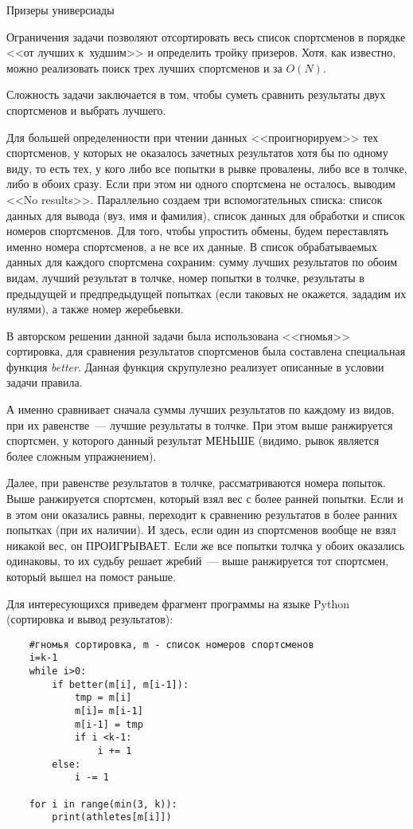 \begin{tutorial}{Призеры универсиады}

Ограничения задачи позволяют отсортировать весь список спортсменов в порядке <<от лучших к~худшим>> и определить тройку призеров. Хотя, как известно, можно реализовать поиск трех лучших спортсменов и за $O(N)$. 

Сложность задачи заключается в том, чтобы суметь сравнить результаты двух спортсменов и выбрать лучшего.

Для большей определенности при чтении данных <<проигнорируем>> тех спортсменов, у которых не оказалось зачетных результатов хотя бы по одному виду, то есть тех, у кого либо все попытки в рывке провалены, либо все в толчке, либо в обоих сразу. Если при этом ни одного спортсмена не осталось, выводим <<No results>>. Параллельно
создаем три вспомогательных списка: список данных для вывода (вуз, имя и фамилия), список данных для обработки и список номеров спортсменов. Для того, чтобы упростить обмены, будем переставлять именно номера спортсменов, а не все их данные. В список обрабатываемых данных для каждого спортсмена сохраним: сумму лучших результатов по обоим видам, лучший результат в толчке, номер попытки в толчке, результаты в предыдущей и предпредыдущей попытках (если таковых не окажется, зададим их нулями), а также номер жеребьевки.

В авторском решении данной задачи была использована <<гномья>> сортировка, для сравнения результатов спортсменов была составлена специальная функция \textit{better}. Данная функция скрупулезно реализует описанные в условии задачи правила.

А именно сравнивает сначала суммы лучших результатов по каждому из видов,
при их равенстве~--- лучшие результаты в толчке. При этом выше ранжируется спортсмен, у которого данный результат МЕНЬШЕ (видимо, рывок является более сложным упражнением).

Далее, при равенстве результатов в толчке, рассматриваются номера попыток. Выше ранжируется спортсмен, который взял вес с более ранней попытки. Если и в этом они оказались равны, переходит к сравнению результатов в более ранних попытках (при их наличии). И здесь, если один из спортсменов вообще не взял никакой вес, он ПРОИГРЫВАЕТ.
Если же все попытки толчка у обоих оказались одинаковы, то их судьбу решает жребий~--- выше ранжируется тот спортсмен, который вышел на помост раньше.

Для интересующихся приведем фрагмент программы на языке Python (сортировка и вывод результатов):
\begin{verbatim}
    #гномья сортировка, m - список номеров спортсменов            
    i=k-1
    while i>0:
        if better(m[i], m[i-1]):
            tmp = m[i]
            m[i]= m[i-1]
            m[i-1] = tmp
            if i <k-1:
                i += 1
        else:
            i -= 1

    for i in range(min(3, k)):
        print(athletes[m[i]])
   
\end{verbatim}

\end{tutorial}
